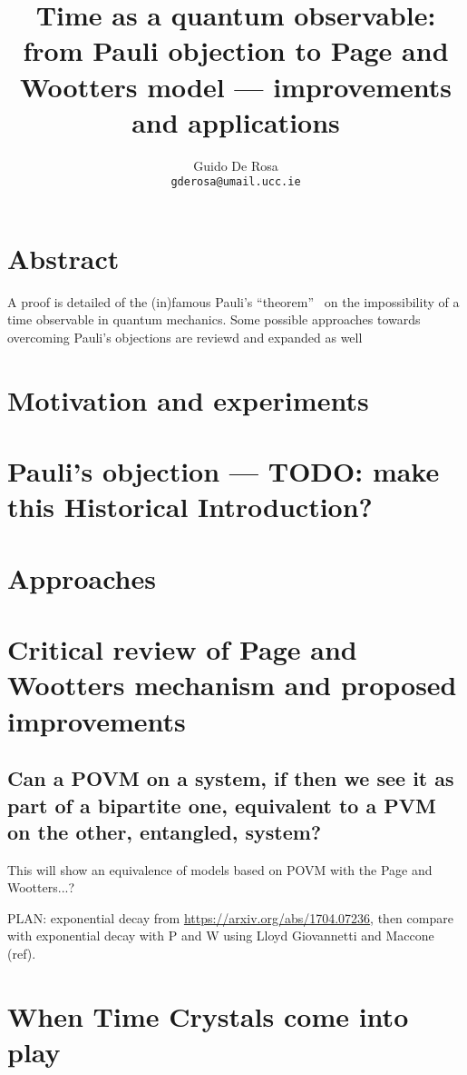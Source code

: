\documentclass{book}
\author{Guido De Rosa \\ \small\tt{gderosa@umail.ucc.ie}}
\title{Time as a quantum observable: from Pauli objection to Page and Wootters model --- improvements and applications}
\begin{document}
\maketitle

\tableofcontents

\chapter*{Abstract}
A proof is detailed of the (in)famous Pauli's ``theorem''~\cite{PauliFootnote}
on the impossibility of a time observable in quantum mechanics. Some possible
approaches towards overcoming Pauli's objections are reviewd and expanded as well

\chapter{Motivation and experiments}


\chapter{Pauli's objection --- TODO: make this Historical Introduction?}



\chapter{Approaches}


\chapter{Critical review of Page and Wootters mechanism and proposed improvements}


\section{Can a POVM on a system, if then we see it as part of a bipartite one, equivalent to a PVM on the other, entangled, system?}
This will show an equivalence of models based on POVM with the Page and Wootters...?

PLAN: exponential decay from \url{https://arxiv.org/abs/1704.07236},
then compare with exponential decay with P and W using Lloyd Giovannetti and Maccone (ref).

\chapter{When Time Crystals come into play}

\end{document}
